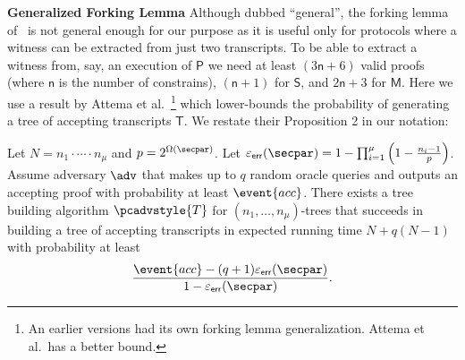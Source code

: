 \documentclass[10pt]{llncs}
\newcommand{\pcvarstyle}[1]{\mathsf{#1}}
\newcommand{\numberofconstrains}{\pcvarstyle{n}}
\newcommand{\noofc}{\numberofconstrains}
\newcommand{\multconstr}{\pcvarstyle{Q_{mult}}}
\newcommand{\linconstr}{\pcvarstyle{Q_{lin}}}
\newcommand{\eps}{\varepsilon}
\newcommand{\tree}{\pcvarstyle{T}}
\newcommand{\pcschemestyle}[1]{\bm{\mathsf{#1}}}
\newcommand{\plonkprot}{\pcschemestyle{P}}
\newcommand{\sonicprot}{\pcschemestyle{S}}
\newcommand{\marlinprot}{\pcschemestyle{M}}
\newcommand{\tdv}{\pcadvstyle{T}}
\newcommand{\accProb}{\event{acc}}
\newcommand{\zdv}{\pcadvstyle{Z}}
\newcommand{\epserr}{\eps_{\pcvarstyle{err}}}
\DeclareRobustCommand{\michals}[2] {} %
\newcommand{\hamid}[2] {} %
\newcommand{\oursubsub}[1] {\smallskip\noindent\textbf{#1}}
\begin{document}
\oursubsub{Generalized Forking Lemma}
Although dubbed ``general'', the forking lemma of~\cite{CCS:BelNev06} is not general enough for our purpose as it is useful only for protocols where a witness can be extracted from just two transcripts. To be able to extract a witness from, say, an execution of $\plonkprot$ we need at least $(3 \numberofconstrains + 6)$ valid proofs (where $\numberofconstrains$ is the number of constrains), $(\numberofconstrains + 1)$ for $\sonicprot$, and $2 \numberofconstrains + 3$ for $\marlinprot$.
Here we use a result by Attema et
al.~\cite{EPRINT:AttFehKlo21}\footnote{An earlier versions had its own forking lemma generalization. Attema et al.\ has a better bound.}  which lower-bounds the probability of generating a tree of accepting transcripts $\tree$. We restate their Proposition 2 in our notation:

\begin{lemma}\label{lem:attema}
	Let $N = n_1 \cdot \cdots \cdot n_\mu$ and $p = 2^{\Omega(\secpar)}$. Let $\epserr(\secpar) = 1 - \prod_{i=1}^{\mu}\left(1 - \frac{n_i - 1}{p}\right)$.
	Assume adversary $\adv$ that makes up to $q$ random
	oracle queries and outputs an accepting proof with probability at least
	$\accProb$. There exists a tree building algorithm $\tdv$ for $(n_1, \ldots, n_\mu)$-trees that %
	succeeds in building a
	tree of accepting transcripts in expected
	running time $N + q (N - 1)$ with probability at least
	\[
	\frac{\accProb - (q + 1) \epserr (\secpar)}{1 - \epserr (\secpar)}.
	\]
\end{lemma}
\end{document}
